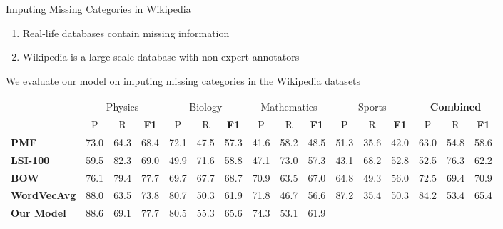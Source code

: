 \documentclass[10pt]{beamer}
\begin{document}
\begin{frame}{Imputing Missing Categories in Wikipedia }
\begin{enumerate}
	\vfill\item Real-life databases contain missing information
	\vfill\item Wikipedia is a large-scale database with non-expert annotators
\end{enumerate}
\vfill
We evaluate our model on imputing missing categories in the Wikipedia datasets
\vfill
	\begin{table}[h!]
	\tabcolsep=1mm
	\tiny
	\begin{center}
	\begin{tabular}{l ccc@{\hskip 3mm} ccc@{\hskip 3mm} ccc@{\hskip 3mm} ccc@{\hskip 3mm} ccc}
	\toprule
	\multirow{2}{*}{} & 
	\multicolumn{3}{c}{{Physics}}         & 
	\multicolumn{3}{c}{{Biology}}        & \multicolumn{3}{c}{{Mathematics}}         & \multicolumn{3}{c}{{Sports}}        & %
	\multicolumn{3}{c}{\textbf{Combined}}              
	\\ 
	\cmidrule(lr){2-4}
	\cmidrule(lr){5-7}
	\cmidrule(lr){8-10}
	\cmidrule(lr){11-13}
	\cmidrule(lr){14-16}
	& 
	{P} & {R} & \textbf{F1} & 
	{P} & {R} & \textbf{F1} & 
	{P} & {R} & \textbf{F1} & 
	{P} & {R} & \textbf{F1} &
	{P} & {R} & \textbf{F1} \\ 
	\midrule
	\textbf{PMF}
	& 73.0   & 64.3  & 68.4
	& 72.1   & 47.5  & 57.3
	& 41.6   & 58.2  & 48.5
	& 51.3   & 35.6  & 42.0
	& 63.0   & 54.8  & 58.6 
	\\
	\textbf{LSI-100}
	& 59.5   & 82.3  & 69.0
	& 49.9   & 71.6  & 58.8
	& 47.1   & 73.0  & 57.3
	& 43.1   & 68.2  & 52.8
	& 52.5   & 76.3  & 62.2
	\\ 
	\textbf{BOW}
	& 76.1   & 79.4  & 77.7
	& 69.7   & 67.7  & 68.7
	& 70.9   & 63.5  & 67.0
	& 64.8   & 49.3  & 56.0
	& 72.5   & 69.4  & 70.9
	\\
	\textbf{WordVecAvg}
	& 88.0   & 63.5  & 73.8
	& 80.7   & 50.3  & 61.9
	& 71.8   & 46.7  & 56.6
	& 87.2   & 35.4  & 50.3
	& 84.2   & 53.4  & 65.4
	\\ \addlinespace[1mm]
	\textbf{Our Model}
	& \multirow{2}{*}{88.6}   & \multirow{2}{*}{69.1}  & \multirow{2}{*}{77.7}
	& \multirow{2}{*}{80.5}   & \multirow{2}{*}{55.3}  & \multirow{2}{*}{65.6}
	& \multirow{2}{*}{74.3}   & \multirow{2}{*}{53.1}  & \multirow{2}{*}{61.9}

\end{tabular}
\end{center}
\end{table}
\end{frame}
\end{document}
